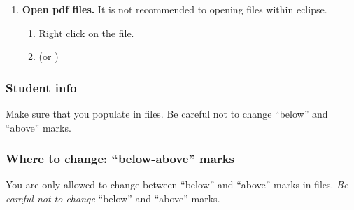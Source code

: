 \begin{enumerate}[label=\roman*.]
	\begin{enumerate}[itemsep=1pt, topsep=1pt] 
		
		\item The password of  is given.
		
		\item Uncompress  using the given password.
		
		\item Import  package(s) into eclipse. 
		Make sure that the package is under .
		\item Start reading the description pdf.
		
	\end{enumerate}

	\item \textbf{Open pdf files.} 
	It is not recommended to opening  files within eclipse.
	\begin{enumerate}
		
		\item Right click on the  file.
		
		\item {} (or )
		
	\end{enumerate}

\end{enumerate}




\subsubsection{Student info}
\label{sec:app:studentInfo} 

Make sure that you populate  in  files.
Be careful not to change ``below'' and ``above'' marks.






\subsubsection{Where to change: ``below-above'' marks} 
\label{sec:app:belowAboveMarker}

You are only allowed to change between ``below'' and ``above'' marks in  files.
\emph{Be careful not to change} ``below'' and ``above'' marks.



